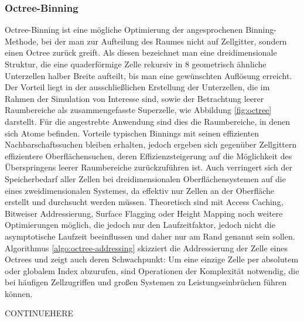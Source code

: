 \subsubsection{Octree-Binning}\label{dataoctree}
Octree-Binning ist eine mögliche Optimierung der angesprochenen Binning-Methode, bei der man zur Aufteilung des Raumes nicht auf Zellgitter, sondern einen Octree zurück greift.
Als diesen bezeichnet man eine dreidimensionale Struktur, die eine quaderförmige Zelle rekursiv in 8 geometrisch ähnliche Unterzellen halber Breite aufteilt, bis man eine gewünschten Auflösung erreicht.
Der Vorteil liegt in der ausschließlichen Erstellung der Unterzellen, die im Rahmen der Simulation von Interesse sind, sowie der Betrachtung leerer Raumbereiche als zusammengefasste Superzelle, wie Abbildung \ref{fig:octree} darstellt.
Für die angestrebte Anwendung sind dies die Raumbereiche, in denen sich Atome befinden.
Vorteile typischen Binnings mit seinen effizienten Nachbarschaftssuchen bleiben erhalten, jedoch ergeben sich gegenüber Zellgittern effizientere Oberflächensuchen, deren Effizienzsteigerung auf die Möglichkeit des Überspringens leerer Raumbereiche zurückzuführen ist.
Auch verringert sich der Speicherbedarf aller Zellen bei dreidimensionalen Oberflächensystemen auf die eines zweidimensionalen Systemes, da effektiv nur Zellen an der Oberfläche erstellt und durchsucht werden müssen.
Theoretisch sind mit Access Caching, Bitweiser Addressierung, Surface Flagging oder Height Mapping noch weitere Optimierungen möglich, die jedoch nur den Laufzeitfaktor, jedoch nicht die asymptotische Laufzeit beeinflussen und daher nur am Rand genannt sein sollen.
Algorithmus \ref{algo:octree-addressing} skizziert die Addressierung der Zelle eines Octrees und zeigt auch deren Schwachpunkt:
Um eine einzige Zelle per absolutem oder globalem Index abzurufen, sind Operationen der Komplexität  notwendig, die bei häufigen Zellzugriffen und großen Systemen zu Leistungseinbrüchen führen können.

CONTINUEHERE

